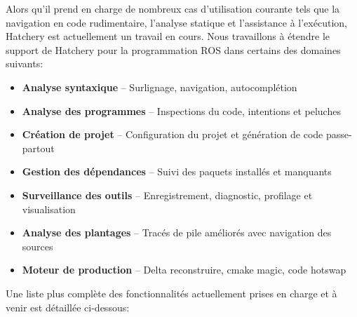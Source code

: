 \noindent Alors qu'il prend en charge de nombreux cas d'utilisation courante tels que la navigation en code rudimentaire, l'analyse statique et l'assistance à l'exécution, Hatchery est actuellement un travail en cours. Nous travaillons à étendre le support de Hatchery pour la programmation ROS dans certains des domaines suivants:\vspace{10pt}
%
\begin{itemize}
\item \textbf{Analyse syntaxique} -- Surlignage, navigation, autocomplétion
\item \textbf{Analyse des programmes} -- Inspections du code, intentions et peluches
\item \textbf{Création de projet} -- Configuration du projet et génération de code passe-partout
\item \textbf{Gestion des dépendances} -- Suivi des paquets installés et manquants
\item \textbf{Surveillance des outils} -- Enregistrement, diagnostic, profilage et visualisation
\item \textbf{Analyse des plantages} -- Tracés de pile améliorés avec navigation des sources
\item \textbf{Moteur de production} -- Delta reconstruire, cmake magic, code hotswap
\end{itemize}\vspace{10pt}
%
Une liste plus complète des fonctionnalités actuellement prises en charge et à venir est détaillée ci-dessous:\vspace{10pt}
%
